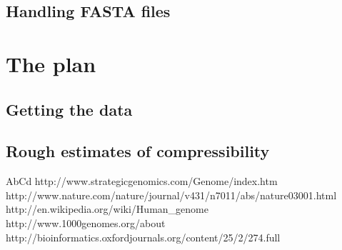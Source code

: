 \documentclass[11pt,twocolumn]{article}
\begin{document}
\subsection*{Handling FASTA files}

\subsection*{}

\section*{The plan}

\subsection*{Getting the data}

\subsection*{Rough estimates of compressibility}

\begin{thebibliography}{9}

AbCd
http://www.strategicgenomics.com/Genome/index.htm
http://www.nature.com/nature/journal/v431/n7011/abs/nature03001.html
http://en.wikipedia.org/wiki/Human\_genome
http://www.1000genomes.org/about
http://bioinformatics.oxfordjournals.org/content/25/2/274.full

\end{thebibliography}
\end{document}
